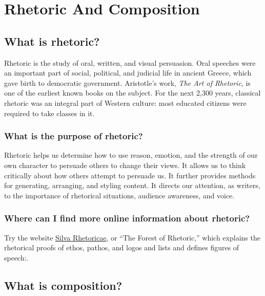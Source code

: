 
\chapter{Rhetoric And Composition}


\section{What is rhetoric?}

Rhetoric is the study of oral, written, and visual persuasion. Oral speeches were an important part of social, political, and judicial life in ancient Greece, which gave birth to democratic government. Aristotle's work, \emph{The Art of Rhetoric}, is one of the earliest known books on the subject. For the next 2,300 years, classical rhetoric was an integral part of Western culture: most educated citizens were required to take classes in it.

\subsection{What is the purpose of rhetoric?}

Rhetoric helps us determine how to use reason, emotion, and the strength of our own character to persuade others to change their views. It allows us to think critically about how others attempt to persuade us. It further provides methods for generating, arranging, and styling content. It directs our attention, as writers, to the importance of rhetorical situations, audience awareness, and voice.

\subsection{Where can I find more online information about rhetoric?}

Try the website \href{http://rhetoric.byu.edu} {Silva Rhetoricae}, or ``The Forest of Rhetoric,'' which explains the rhetorical proofs of ethos, pathos, and logos and lists and defines figures of speech:.


\section{What is composition?}

